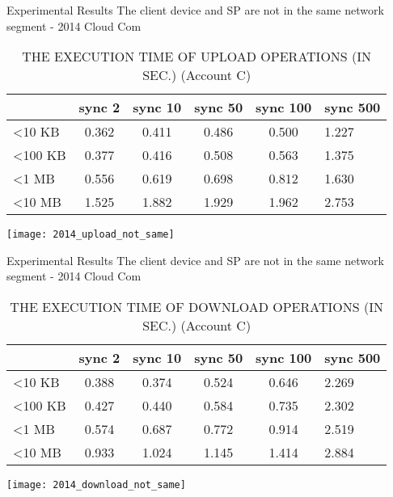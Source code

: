 \begin{frame}{Experimental Results}
{The client device and SP are \alert{not} in the same network segment - 2014 Cloud Com}
	\scriptsize
    \begin{table}[]
    \centering
    \caption{THE EXECUTION TIME OF \alert{UPLOAD} OPERATIONS (IN SEC.) (Account C)}
    \begin{tabular}{lccccl}
                         & sync 2   & sync 10  & sync 50  & sync 100 & sync 500  \\ \hline
        \textless 10 KB  & 0.362 & 0.411 & 0.486 & 0.500 & 1.227  \\ \hline
        \textless 100 KB & 0.377 & 0.416 & 0.508 & 0.563 & 1.375  \\ \hline
        \textless 1 MB   & 0.556 & 0.619 & 0.698 & 0.812 & 1.630  \\ \hline
        \textless 10 MB  & 1.525 & 1.882 & 1.929 & 1.962 & 2.753  \\ \hline
    \end{tabular}
    \end{table}
    \begin{center}
		\texttt{[image: 2014\_upload\_not\_same]}
    \end{center}
\end{frame}

\begin{frame}{Experimental Results}
{The client device and SP are \alert{not} in the same network segment - 2014 Cloud Com}
	\scriptsize
    \begin{table}[]
    \centering
    \caption{THE EXECUTION TIME OF \alert{DOWNLOAD} OPERATIONS (IN SEC.) (Account C)}
    \begin{tabular}{lccccl}
                         & sync 2   & sync 10  & sync 50  & sync 100 & sync 500  \\ \hline
        \textless 10 KB  & 0.388 & 0.374 & 0.524 & 0.646 & 2.269  \\ \hline
        \textless 100 KB & 0.427 & 0.440 & 0.584 & 0.735 & 2.302  \\ \hline
        \textless 1 MB   & 0.574 & 0.687 & 0.772 & 0.914 & 2.519  \\ \hline
        \textless 10 MB  & 0.933 & 1.024 & 1.145 & 1.414 & 2.884  \\ \hline
    \end{tabular}
    \end{table}
    \begin{center}
		\texttt{[image: 2014\_download\_not\_same]}
    \end{center}
\end{frame}

